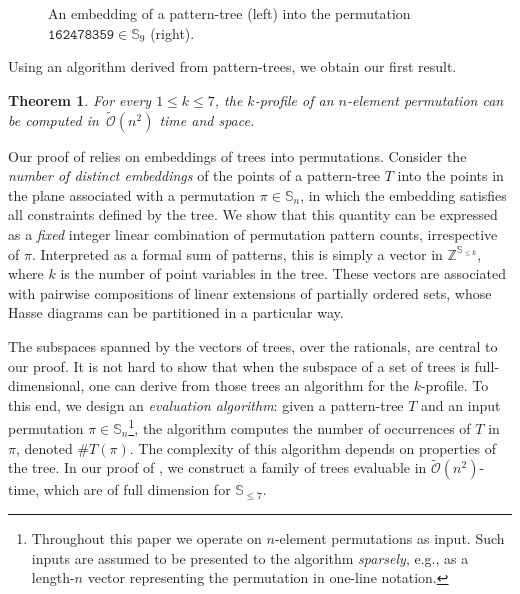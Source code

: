 \documentclass{article}
\newcommand{\Sn}{\mathbb{S}_n}
\newcommand{\ZZ}{\mathbb{Z}}
\theoremstyle{remark}
\newcommand{\Otilde}[1]{\widetilde{\mathcal{O}}\left( #1 \right)}
\theoremstyle{plain}
\newtheorem{introthm}{Theorem}
\begin{document}
\begin{figure}[H]
    \caption{An embedding of a pattern-tree (left) into the permutation $\mathtt{162478359} \in \mathbb{S}_9$ (right).}
    \label{fig:pattern_tree_simple}
\end{figure}

Using an algorithm derived from pattern-trees, we obtain our first result.
\begin{introthm}
    \label{introthm:fast_le_7_profile}
    For every $1 \le k \le 7$, the $k$-profile of an $n$-element permutation can be computed in~$\Otilde{n^2}$ time and space.
\end{introthm}

Our proof of  relies on embeddings of trees into permutations.
Consider the \textit{number of distinct embeddings} of the points of a pattern-tree $T$
into the points in the plane associated with a permutation $\pi \in \Sn$,
in which the embedding satisfies all constraints defined by the tree. 
We show that this quantity
can be expressed as a \textit{fixed} integer linear combination
of permutation pattern counts, irrespective of $\pi$.
Interpreted as a formal sum of patterns,
this is simply a vector in $\ZZ^{\mathbb{S}_{\le k}}$,
where $k$ is the number of point variables in the tree.
These vectors are associated
with pairwise compositions of linear extensions of partially ordered sets,
whose Hasse diagrams can be partitioned in a particular way.

The subspaces spanned by the vectors of trees, over the rationals, are central to our proof. 
It is not hard to show that when the subspace of a set of trees is full-dimensional,
one can derive from those trees an algorithm for the $k$-profile.
To this end, we design an \textit{evaluation algorithm}: 
given a pattern-tree $T$ and an input permutation $\pi \in \Sn$\footnote{
Throughout this paper we operate on $n$-element permutations as input. Such inputs are assumed to be presented to the algorithm \textit{sparsely},  e.g., as a length-$n$ vector representing the permutation in one-line notation.},
the algorithm computes the number of occurrences of $T$ in $\pi$, denoted $\#T(\pi)$.
The complexity of this algorithm depends on properties of the tree.
In our proof of ,
we construct a family of trees evaluable in $\Otilde{n^2}$-time,
which are of full dimension for $\mathbb{S}_{\le 7}$. 
\end{document}
